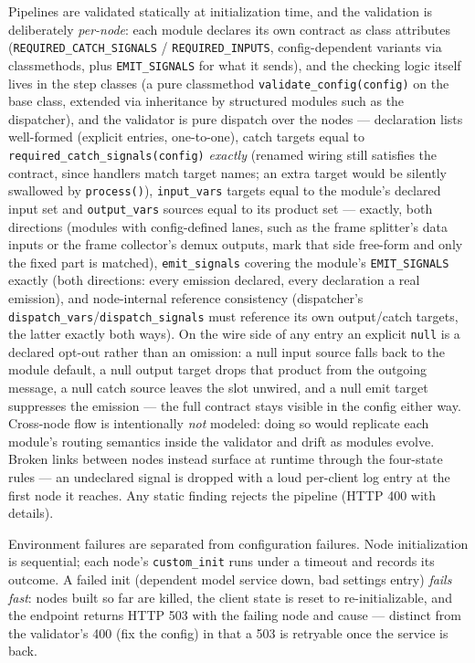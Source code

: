 \documentclass[11pt,a4paper]{article}
\begin{document}
Pipelines are validated statically at initialization time, and the validation is deliberately \emph{per-node}: each module declares its own contract as class attributes (\texttt{REQUIRED\_CATCH\_SIGNALS} / \texttt{REQUIRED\_INPUTS}, config-dependent variants via classmethods, plus \texttt{EMIT\_SIGNALS} for what it sends), and the checking logic itself lives in the step classes (a pure classmethod \texttt{validate\_config(config)} on the base class, extended via inheritance by structured modules such as the dispatcher), and the validator is pure dispatch over the nodes --- declaration lists well-formed (explicit entries, one-to-one), catch targets equal to \texttt{required\_catch\_signals(config)} \emph{exactly} (renamed wiring still satisfies the contract, since handlers match target names; an extra target would be silently swallowed by \texttt{process()}), \texttt{input\_vars} targets equal to the module's declared input set and \texttt{output\_vars} sources equal to its product set --- exactly, both directions (modules with config-defined lanes, such as the frame splitter's data inputs or the frame collector's demux outputs, mark that side free-form and only the fixed part is matched), \texttt{emit\_signals} covering the module's \texttt{EMIT\_SIGNALS} exactly (both directions: every emission declared, every declaration a real emission), and node-internal reference consistency (dispatcher's \texttt{dispatch\_vars}/\texttt{dispatch\_signals} must reference its own output/catch targets, the latter exactly both ways). On the wire side of any entry an explicit \texttt{null} is a declared opt-out rather than an omission: a null input source falls back to the module default, a null output target drops that product from the outgoing message, a null catch source leaves the slot unwired, and a null emit target suppresses the emission --- the full contract stays visible in the config either way. Cross-node flow is intentionally \emph{not} modeled: doing so would replicate each module's routing semantics inside the validator and drift as modules evolve. Broken links between nodes instead surface at runtime through the four-state rules --- an undeclared signal is dropped with a loud per-client log entry at the first node it reaches. Any static finding rejects the pipeline (HTTP 400 with details).

Environment failures are separated from configuration failures. Node initialization is sequential; each node's \texttt{custom\_init} runs under a timeout and records its outcome. A failed init (dependent model service down, bad settings entry) \emph{fails fast}: nodes built so far are killed, the client state is reset to re-initializable, and the endpoint returns HTTP 503 with the failing node and cause --- distinct from the validator's 400 (fix the config) in that a 503 is retryable once the service is back.
\end{document}
